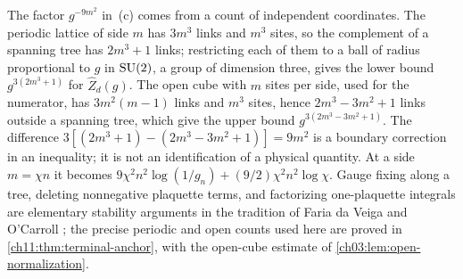 \begin{remark}\label{ch19:rem:surface-term}
The factor $g^{-9m^2}$ in~(c) comes from a count of independent coordinates. The periodic lattice of side $m$ has $3m^3$ links and $m^3$ sites, so the complement of a spanning tree has $2m^3+1$ links; restricting each of them to a ball of radius proportional to $g$ in $\mathrm{SU}(2)$, a group of dimension three, gives the lower bound $g^{3(2m^3+1)}$ for $\widehat Z_d(g)$. The open cube with $m$ sites per side, used for the numerator, has $3m^2(m-1)$ links and $m^3$ sites, hence $2m^3-3m^2+1$ links outside a spanning tree, which give the upper bound $g^{3(2m^3-3m^2+1)}$. The difference $3[(2m^3+1)-(2m^3-3m^2+1)]=9m^2$ is a boundary correction in an inequality; it is not an identification of a physical quantity. At a side $m=\chi n$ it becomes $9\chi^2n^2\log(1/g_n)+(9/2)\chi^2n^2\log\chi$. Gauge fixing along a tree, deleting nonnegative plaquette terms, and factorizing one-plaquette integrals are elementary stability arguments in the tradition of Faria da Veiga and O'Carroll \cite{FariaVeigaOCarroll2019,FariaVeigaOCarroll2025}; the precise periodic and open counts used here are proved in \cref{ch11:thm:terminal-anchor}, with the open-cube estimate of \cref{ch03:lem:open-normalization}.
\end{remark}

